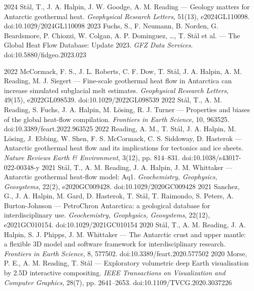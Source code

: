 \documentclass[11pt, a4paper]{cvClass}
\begin{document}
\begin{cvhonors}
  \cvhonor
    {2024}
    {Stål, T., J. A. Halpin, J. W. Goodge, A. M. Reading — Geology matters for Antarctic geothermal heat. \textit{Geophysical Research Letters}, 51(13), e2024GL110098. doi:10.1029/2024GL110098}
    {}
    {}
  \cvhonor
    {2023}
    {Fuchs, S., F. Neumann, B. Norden, G. Beardsmore, P. Chiozzi, W. Colgan, A. P. Dominguez, \dots, T. Stål et al. — The Global Heat Flow Database: Update 2023. \textit{GFZ Data Services}. doi:10.5880/fidgeo.2023.023}
    {}
    {}

  \cvhonor
    {2022}
    {McCormack, F. S., J. L. Roberts, C. F. Dow, T. Stål, J. A. Halpin, A. M. Reading, M. J. Siegert — Fine-scale geothermal heat flow in Antarctica can increase simulated subglacial melt estimates. \textit{Geophysical Research Letters}, 49(15), e2022GL098539. doi:10.1029/2022GL098539}
    {}
    {}
  \cvhonor
    {2022}
    {Stål, T., A. M. Reading, S. Fuchs, J. A. Halpin, M. Lösing, R. J. Turner — Properties and biases of the global heat-flow compilation. \textit{Frontiers in Earth Science}, 10, 963525. doi:10.3389/feart.2022.963525}
    {}
    {}
  \cvhonor
    {2022}
    {Reading, A. M., T. Stål, J. A. Halpin, M. Lösing, J. Ebbing, W. Shen, F. S. McCormack, C. S. Siddoway, D. Hasterok — Antarctic geothermal heat flow and its implications for tectonics and ice sheets. \textit{Nature Reviews Earth \& Environment}, 3(12), pp. 814–831. doi:10.1038/s43017-022-00348-y}
    {}
    {}
  \cvhonor
    {2021}
    {Stål, T., A. M. Reading, J. A. Halpin, J. M. Whittaker — Antarctic geothermal heat-flow model: Aq1. \textit{Geochemistry, Geophysics, Geosystems}, 22(2), e2020GC009428. doi:10.1029/2020GC009428}
    {}
    {}
  \cvhonor
    {2021}
    {Sanchez, G., J. A. Halpin, M. Gard, D. Hasterok, T. Stål, T. Raimondo, S. Peters, A. Burton-Johnson — PetroChron Antarctica: a geological database for interdisciplinary use. \textit{Geochemistry, Geophysics, Geosystems}, 22(12), e2021GC010154. doi:10.1029/2021GC010154}
    {}
    {}
  \cvhonor
    {2020}
    {Stål, T., A. M. Reading, J. A. Halpin, S. J. Phipps, J. M. Whittaker — The Antarctic crust and upper mantle: a flexible 3D model and software framework for interdisciplinary research. \textit{Frontiers in Earth Science}, 8, 577502. doi:10.3389/feart.2020.577502}
    {}
    {}
  \cvhonor
    {2020}
    {Morse, P. E., A. M. Reading, T. Stål — Exploratory volumetric deep Earth visualisation by 2.5D interactive compositing. \textit{IEEE Transactions on Visualization and Computer Graphics}, 28(7), pp. 2641–2653. doi:10.1109/TVCG.2020.3037226}

\end{cvhonors}
\end{document}
